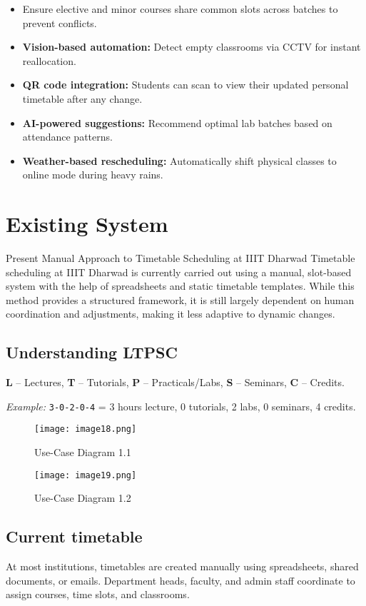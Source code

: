 \documentclass[12pt]{article}
\begin{document}
\begin{itemize}
    \item Ensure elective and minor courses share common slots across batches to prevent conflicts.
    \item \textbf{Vision-based automation:} Detect empty classrooms via CCTV for instant reallocation.
    \item \textbf{QR code integration:} Students can scan to view their updated personal timetable after any change.
    \item \textbf{AI-powered suggestions:} Recommend optimal lab batches based on attendance patterns.
    \item \textbf{Weather-based rescheduling:} Automatically shift physical classes to online mode during heavy rains.
\end{itemize}


\section{Existing System}
Present Manual Approach to Timetable Scheduling at IIIT Dharwad Timetable scheduling at IIIT Dharwad is currently carried out using a manual, slot-based system with the help of spreadsheets and static timetable templates. While this method provides a structured framework, it is still largely dependent on human coordination and adjustments, making it less adaptive to dynamic changes.
\subsection{Understanding LTPSC} 
\textbf{L} – Lectures, \quad
\textbf{T} – Tutorials, \quad
\textbf{P} – Practicals/Labs, \quad
\textbf{S} – Seminars, \quad
\textbf{C} – Credits.

\textit{Example:} \texttt{3-0-2-0-4} = 3 hours lecture, 0 tutorials, 2 labs, 0 seminars, 4 credits.
\begin{figure}[H]
    \centering
    \texttt{[image: image18.png]}
    \caption{Use-Case Diagram 1.1}
    \label{fig:placeholder}
\end{figure}
\begin{figure}[H]
    \centering
    \texttt{[image: image19.png]}
    \caption{Use-Case Diagram 1.2}
    \label{fig:placeholder}
\end{figure}

\subsection{Current timetable}
At most institutions, timetables are created manually using spreadsheets, shared documents, or emails. Department heads, faculty, and admin staff coordinate to assign courses, time slots, and classrooms.
\end{document}
